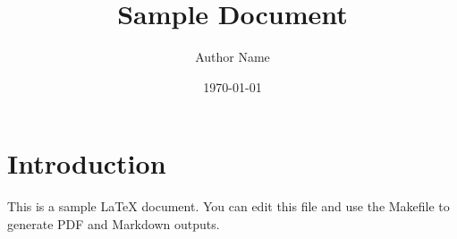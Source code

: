 \documentclass{article}
\title{Sample Document}
\author{Author Name}
\date{\today}
\begin{document}
\maketitle

\section{Introduction}
This is a sample LaTeX document. You can edit this file and use the Makefile to generate PDF and Markdown outputs.
\end{document}
